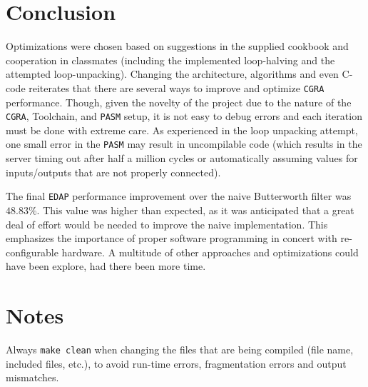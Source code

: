 \documentclass[letterpaper, 10 pt, conference]{ieeeconf}  %
\begin{document}
\section{Conclusion}

Optimizations were chosen based on suggestions in the supplied cookbook and cooperation in classmates (including the implemented loop-halving and the attempted loop-unpacking). Changing the architecture, algorithms and even C-code reiterates that there are several ways to improve and optimize \texttt{CGRA} performance. Though, given the novelty of the project due to the nature of the \texttt{CGRA}, Toolchain, and \texttt{PASM} setup, it is not easy to debug errors and each iteration must be done with extreme care. As experienced in the loop unpacking attempt, one small error in the \texttt{PASM} may result in uncompilable code (which results in the server timing out after half a million cycles or automatically assuming values for inputs/outputs that are not properly connected).

The final \texttt{EDAP} performance improvement over the naive Butterworth filter was $48.83\%$. This value was higher than expected, as it was anticipated that a great deal of effort would be needed to improve the naive implementation. This emphasizes the importance of proper software programming in concert with re-configurable hardware. A multitude of other approaches and optimizations could have been explore, had there been more time. 















\section{Notes}
Always \texttt{make clean} when changing the files that are being compiled (file name, included files, etc.), to avoid run-time errors, fragmentation errors and output mismatches.

\addtolength{\textheight}{-12cm}   %
\end{document}
